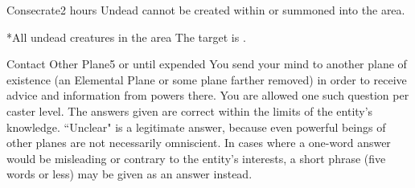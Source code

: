 \begin{spellsection}{Consecrate}{2}
 hours
\spellline
\spelleffect Undead cannot be created within or summoned into the area.
\begin{spelltarget}*{All undead creatures in the area}
    \spelleffect The target is \vulnerable.
\end{spelltarget}
\end{spellsection}

\begin{spellsection}{Contact Other Plane}{5}
\spelldur \durmed or until expended
\spelleffect You send your mind to another plane of existence (an Elemental Plane or some plane farther removed) in order to receive advice and information from powers there. You are allowed one such question per caster level. The answers given are correct within the limits of the entity's knowledge. ``Unclear" is a legitimate answer, because even powerful beings of other planes are not necessarily omniscient. In cases where a one-word answer would be misleading or contrary to the entity's interests, a short phrase (five words or less) may be given as an answer instead.
\end{spellsection}

